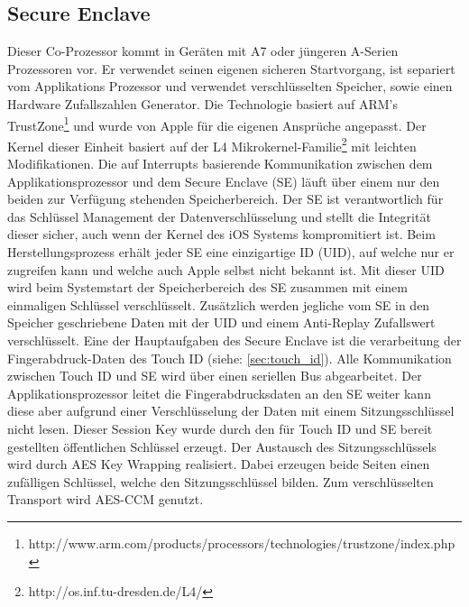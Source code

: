 	\subsection{Secure Enclave}
		Dieser Co-Prozessor kommt in Geräten mit A7 oder jüngeren A-Serien Prozessoren
		vor. Er verwendet seinen eigenen sicheren Startvorgang, ist separiert vom
		Applikations Prozessor und verwendet verschlüsselten Speicher, sowie einen
		Hardware Zufallszahlen Generator. Die Technologie basiert auf ARM's
		TrustZone\footnote{http://www.arm.com/products/processors/technologies/trustzone/index.php}
		und wurde von Apple für die eigenen Ansprüche angepasst. Der Kernel dieser
		Einheit basiert auf der L4
		Mikrokernel-Familie\footnote{http://os.inf.tu-dresden.de/L4/} mit leichten
		Modifikationen. Die auf Interrupts basierende Kommunikation zwischen dem Applikationsprozessor und dem Secure Enclave (SE) läuft über
		einem nur den beiden zur Verfügung stehenden Speicherbereich. Der SE ist
		verantwortlich für das Schlüssel Management der Datenverschlüsselung und
		stellt die Integrität dieser sicher, auch wenn der Kernel des iOS Systems
		kompromitiert ist. Beim Herstellungsprozess erhält jeder SE eine einzigartige
		ID (UID), auf welche nur er zugreifen kann und welche auch Apple selbst nicht
		bekannt ist. Mit dieser UID wird beim Systemstart der Speicherbereich des SE
		zusammen mit einem einmaligen Schlüssel verschlüsselt. Zusätzlich werden
		jegliche vom SE in den Speicher geschriebene Daten mit der UID und einem
		Anti-Replay Zufallswert verschlüsselt. Eine der Hauptaufgaben des Secure
		Enclave ist die verarbeitung der Fingerabdruck-Daten des Touch
		ID (siehe: \ref{sec:touch_id}). Alle Kommunikation zwischen Touch ID und SE
		wird über einen seriellen Bus abgearbeitet. Der Applikationsprozessor leitet die Fingerabdrucksdaten an den
		SE weiter kann diese aber aufgrund einer Verschlüsselung der Daten mit einem
		Sitzungsschlüssel nicht lesen. Dieser Session Key wurde durch den für Touch ID
		und SE bereit gestellten öffentlichen Schlüssel erzeugt. Der Austausch des
		Sitzungsschlüssels wird durch AES Key Wrapping realisiert. Dabei erzeugen
		beide Seiten einen zufälligen Schlüssel, welche den Sitzungsschlüssel bilden.
		Zum verschlüsselten Transport wird AES-CCM genutzt.
